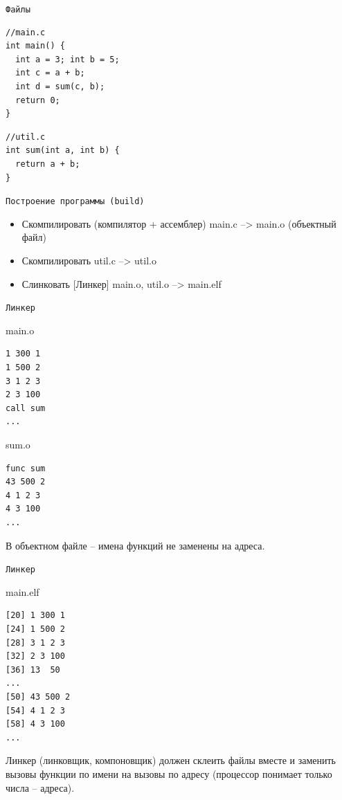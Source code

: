 \documentclass[pdf, 10pt, unicode]{beamer}
\begin{document}
\begin{frame}[fragile]{{\tt Файлы}}
\begin{verbatim}
//main.c
int main() {
  int a = 3; int b = 5;
  int c = a + b;
  int d = sum(c, b);
  return 0;
}
\end{verbatim}
\begin{verbatim}
//util.c
int sum(int a, int b) {
  return a + b;
}
\end{verbatim}

\end{frame}

\begin{frame}[fragile]{{\tt Построение программы (build)}}

\begin{itemize}
  \item Скомпилировать (компилятор + ассемблер) main.c --> main.o (объектный файл)
  \item Скомпилировать util.c --> util.o
  \item Слинковать [Линкер] main.o, util.o --> main.elf
\end{itemize}

\end{frame}

\begin{frame}[fragile]{{\tt Линкер}}

main.o
\begin{verbatim}
1 300 1
1 500 2
3 1 2 3
2 3 100
call sum
...
\end{verbatim}

sum.o
\begin{verbatim}
func sum
43 500 2
4 1 2 3
4 3 100
...
\end{verbatim}

В объектном файле -- имена функций не заменены на адреса.

\end{frame}

\begin{frame}[fragile]{{\tt Линкер}}

main.elf
\begin{verbatim}
[20] 1 300 1
[24] 1 500 2
[28] 3 1 2 3
[32] 2 3 100
[36] 13  50
...
[50] 43 500 2
[54] 4 1 2 3
[58] 4 3 100
...
\end{verbatim}

Линкер (линковщик, компоновщик) должен склеить файлы вместе и заменить вызовы функции по имени на вызовы по адресу (процессор
понимает только числа -- адреса).

\end{frame}
\end{document}
